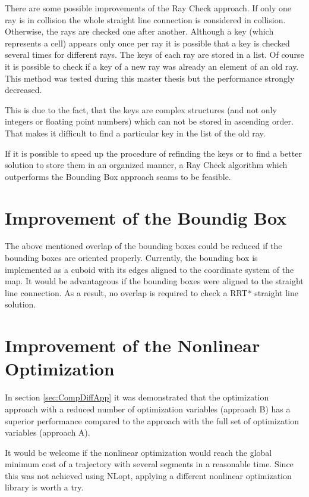 There are some possible improvements of the Ray Check approach. If only one ray is in collision the whole straight line connection is considered in collision. Otherwise,  the rays are checked one after another. Although a key (which represents a cell) appears only once per ray it is possible that a key is checked several times for different rays. The keys of each ray are stored in a list. Of course it is possible to check if a key of a new ray was already an element of an old ray. This method was tested during this master thesis but the performance strongly decreased. 

This is due to the fact, that the keys are complex structures (and not only integers or floating point numbers) which can not be stored in ascending order. That makes it difficult to find a particular key in the list of the old ray. \newline

If it is possible to speed up the procedure of refinding the keys or to find a better solution to store them in an organized manner, a Ray Check algorithm which outperforms the Bounding Box approach seams to be feasible.

\section{Improvement of the Boundig Box}\label{sec:furureBoundingBox}

The above mentioned overlap of the bounding boxes could be reduced if the bounding boxes are oriented properly. Currently, the bounding box is implemented as a cuboid with its edges aligned to the coordinate system of the map. It would be advantageous if the bounding boxes were aligned to the straight line connection. As a result, no overlap is required to check a RRT* straight line solution. 

\section{Improvement of the Nonlinear Optimization}\label{sec:furureNonOpt}

In section \ref{sec:CompDiffApp} it was demonstrated that the optimization approach with a reduced number of optimization variables (approach B) has a superior performance compared to the approach with the full set of optimization variables (approach A).  \newline

It would be welcome if the nonlinear optimization would reach the global minimum cost of a trajectory with several segments in a reasonable time. Since this was not achieved using NLopt, applying a different nonlinear optimization library is worth a try.

